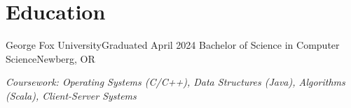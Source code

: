 \section{Education}
  \resumeSubHeadingListStart
    \resumeSubheading
        {George Fox University}{Graduated April 2024}
        {Bachelor of Science in Computer Science}{Newberg, OR}
        {\item{\small{\textit{Coursework: Operating Systems (C/C++), Data Structures (Java), Algorithms (Scala), Client-Server Systems}}}}
  \resumeSubHeadingListEnd
